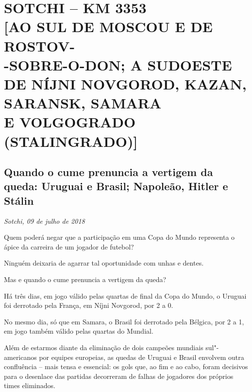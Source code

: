 


\movetooddpage
{}
\part*{SOTCHI -- KM 3353\\{[}AO SUL DE MOSCOU E DE ROSTOV-\\-SOBRE-O-DON; A SUDOESTE DE NÍJNI NOVGOROD, KAZAN, SARANSK, SAMARA\\E VOLGOGRADO (STALINGRADO){]}}


\chapter*{Quando o cume prenuncia a vertigem da queda: Uruguai e Brasil; Napoleão, Hitler e Stálin}

\begin{flushright}
\emph{Sotchi, 09 de julho de 2018}
\end{flushright}

Quem poderá negar que a participação em uma Copa do Mundo representa o
ápice da carreira de um jogador de futebol?

Ninguém deixaria de agarrar tal oportunidade com unhas e dentes.

Mas e quando o cume prenuncia a vertigem da queda?

Há três dias, em jogo válido pelas quartas de final da Copa do Mundo, o
Uruguai foi derrotado pela França, em Níjni Novgorod, por 2 a 0.

No mesmo dia, só que em Samara, o Brasil foi derrotado pela Bélgica, por
2 a 1, em jogo também válido pelas quartas do Mundial.

Além de estarmos diante da eliminação de dois campeões mundiais
sul"-americanos por equipes europeias, as quedas de Uruguai e Brasil
envolvem outra confluência -- mais tensa e essencial: os gols que, ao
fim e ao cabo, foram decisivos para o desenlace das partidas decorreram
de falhas de jogadores dos próprios times eliminados.

